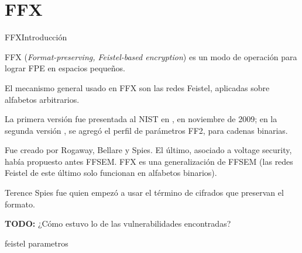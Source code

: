 %
%

\section{FFX}

\begin{frame}{FFX}{Introducción}

  FFX (\textit{Format-preserving, Feistel-based encryption}) es un modo de
  operación para lograr FPE en espacios pequeños.

  El mecanismo general usado en FFX son las redes Feistel, aplicadas sobre
  alfabetos arbitrarios.

  La primera versión fue presentada al NIST en \cite{ffx_1}, en noviembre de
  2009; en la segunda versión \cite{ffx_2}, se agregó el perfil de parámetros
  FF2, para cadenas binarias.

  \note
  {
    Fue creado por Rogaway, Bellare y Spies. El último, asociado a voltage
    security, había propuesto antes FFSEM. FFX es una generalización de
    FFSEM (las redes Feistel de este último solo funcionan en alfabetos
    binarios).

    Terence Spies fue quien empezó a usar el término de cifrados que preservan
    el formato.

    \textbf{TODO:} ¿Cómo estuvo lo de las vulnerabilidades encontradas?
  }

\end{frame}

{feistel}
{parametros}
